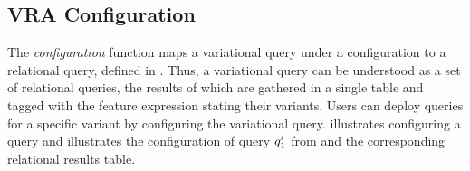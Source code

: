 \subsection{VRA Configuration}
\label{sec:vraconf}



%

%
The \emph{configuration} function maps a variational query under
a configuration
to a relational query, defined in . Thus, a variational query 
can be understood as a set of relational queries, the results of which are gathered
in a single table and tagged with the feature expression stating their variants.
%
Users can deploy queries for a specific variant by configuring 
the variational query.
%
 illustrates configuring a query
and  illustrates the configuration of query $\VVal {\vQ_1}$ from  and the corresponding relational results table.

%


